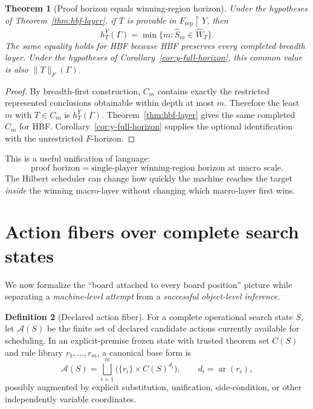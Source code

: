 \documentclass[11pt]{article}
\newtheorem{theorem}{Theorem}[section]
\theoremstyle{definition}
\newtheorem{definition}[theorem]{Definition}
\newcommand{\ar}{\operatorname{ar}}
\begin{document}
\begin{theorem}[Proof horizon equals winning-region horizon]\label{thm:horizon-win}
Under the hypotheses of Theorem~\ref{thm:hbf-layer}, if $T$ is provable in $F_{\mathrm{rep}}\!\upharpoonright\!Y$, then
\[
\boxed{
h_T^Y(\Gamma)
=
\min\{m:\widehat S_m\in\widehat W_T\}.
}
\]
The same equality holds for HBF because HBF preserves every completed breadth layer. Under the hypotheses of Corollary~\ref{cor:y-full-horizon}, this common value is also $\|T\|_F(\Gamma)$.
\end{theorem}

\begin{proof}
By breadth-first construction, $C_m$ contains exactly the restricted represented conclusions obtainable within depth at most $m$. Therefore the least $m$ with $T\in C_m$ is $h_T^Y(\Gamma)$. Theorem~\ref{thm:hbf-layer} gives the same completed $C_m$ for HBF. Corollary~\ref{cor:y-full-horizon} supplies the optional identification with the unrestricted $F$-horizon.
\end{proof}

This is a useful unification of language:
\[
\boxed{\text{proof horizon}=\text{single-player winning-region horizon at macro scale}.}
\]
The Hilbert scheduler can change how quickly the machine reaches the target \emph{inside} the winning macro-layer without changing which macro-layer first wins.

\section{Action fibers over complete search states}

We now formalize the ``board attached to every board position'' picture while separating a \emph{machine-level attempt} from a \emph{successful object-level inference}.

\begin{definition}[Declared action fiber]\label{def:action-fiber}
For a complete operational search state $S$, let $\mathcal A(S)$ be the finite set of declared candidate actions currently available for scheduling. In an explicit-premise frozen state with trusted theorem set $C(S)$ and rule library $r_1,\ldots,r_m$, a canonical base form is
\[
\mathcal A(S)
=
\bigsqcup_{i=1}^m
\bigl(\{r_i\}\times C(S)^{d_i}\bigr),
\qquad d_i=\ar(r_i),
\]
possibly augmented by explicit substitution, unification, side-condition, or other independently variable coordinates.
\end{definition}
\end{document}
